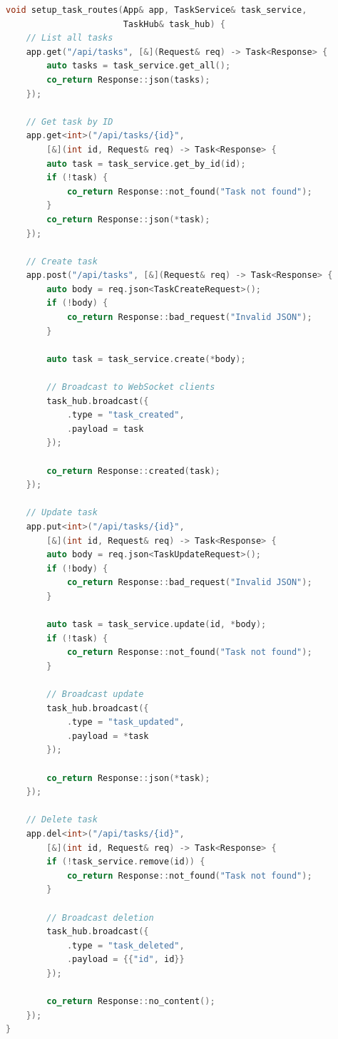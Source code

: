 \begin{lstlisting}[language=C++, basicstyle=\small\ttfamily, caption={Task API handlers}]
void setup_task_routes(App& app, TaskService& task_service, 
                       TaskHub& task_hub) {
    // List all tasks
    app.get("/api/tasks", [&](Request& req) -> Task<Response> {
        auto tasks = task_service.get_all();
        co_return Response::json(tasks);
    });
    
    // Get task by ID
    app.get<int>("/api/tasks/{id}", 
        [&](int id, Request& req) -> Task<Response> {
        auto task = task_service.get_by_id(id);
        if (!task) {
            co_return Response::not_found("Task not found");
        }
        co_return Response::json(*task);
    });
    
    // Create task
    app.post("/api/tasks", [&](Request& req) -> Task<Response> {
        auto body = req.json<TaskCreateRequest>();
        if (!body) {
            co_return Response::bad_request("Invalid JSON");
        }
        
        auto task = task_service.create(*body);
        
        // Broadcast to WebSocket clients
        task_hub.broadcast({
            .type = "task_created",
            .payload = task
        });
        
        co_return Response::created(task);
    });
    
    // Update task
    app.put<int>("/api/tasks/{id}", 
        [&](int id, Request& req) -> Task<Response> {
        auto body = req.json<TaskUpdateRequest>();
        if (!body) {
            co_return Response::bad_request("Invalid JSON");
        }
        
        auto task = task_service.update(id, *body);
        if (!task) {
            co_return Response::not_found("Task not found");
        }
        
        // Broadcast update
        task_hub.broadcast({
            .type = "task_updated",
            .payload = *task
        });
        
        co_return Response::json(*task);
    });
    
    // Delete task
    app.del<int>("/api/tasks/{id}", 
        [&](int id, Request& req) -> Task<Response> {
        if (!task_service.remove(id)) {
            co_return Response::not_found("Task not found");
        }
        
        // Broadcast deletion
        task_hub.broadcast({
            .type = "task_deleted",
            .payload = {{"id", id}}
        });
        
        co_return Response::no_content();
    });
}
\end{lstlisting}

